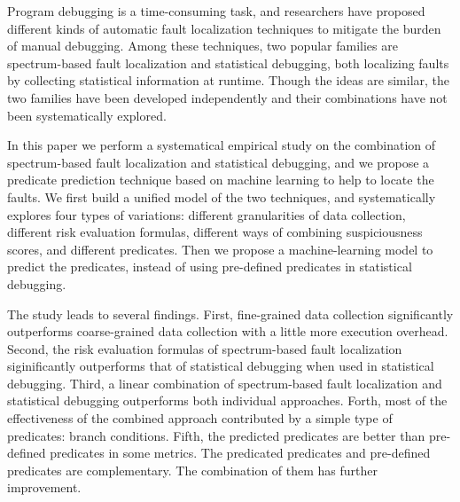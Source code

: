\begin{eabstract}

Program debugging is a time-consuming task,
and researchers have proposed different kinds of automatic fault localization techniques
to mitigate the burden of manual debugging.
Among these techniques, two popular families are spectrum-based fault localization
and statistical debugging,
both localizing faults by collecting statistical information at runtime.
Though the ideas are similar, the two families have been developed independently
and their combinations have not been systematically explored.

In this paper we perform a systematical empirical study on the combination of spectrum-based
fault localization and statistical debugging,
and we propose a predicate prediction technique based on machine learning to help to locate the faults.
We first build a unified model of the two techniques,
and systematically explores four types of variations:
different granularities of data collection,
different risk evaluation formulas, different ways of combining suspiciousness scores,
and different predicates.
Then we propose a machine-learning model to predict the predicates,
instead of using pre-defined predicates in statistical debugging.

The study leads to several findings.
First, fine-grained data collection significantly outperforms
coarse-grained data collection with a little more execution overhead.
Second, the risk evaluation formulas of spectrum-based fault localization
siginificantly outperforms that of statistical debugging when used in statistical debugging.
Third, a linear combination of spectrum-based fault localization and
statistical debugging outperforms both individual approaches.
Forth, most of the effectiveness of the combined approach contributed by a simple type of predicates:
branch conditions.
Fifth, the predicted predicates are better than pre-defined predicates in some metrics.
The predicated predicates and pre-defined predicates are complementary.
The combination of them has further improvement.
\end{eabstract}

